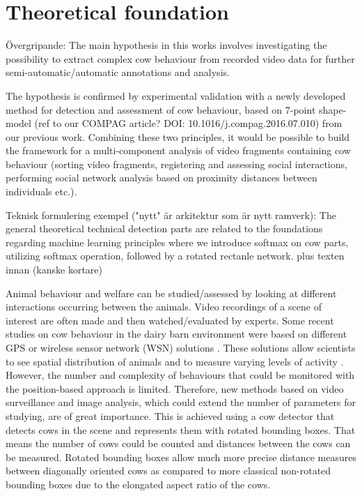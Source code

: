 \documentclass[10pt,a4paper]{article}
\begin{document}
\section{Theoretical foundation}

Övergripande:
The main hypothesis in this works involves investigating the possibility to extract complex cow behaviour from recorded video data for further semi-automatic/automatic annotations and analysis. 

The hypothesis is confirmed by experimental validation with a newly developed method for detection and assessment of cow behaviour, based on 7-point shape-model (ref to our COMPAG article? DOI: 10.1016/j.compag.2016.07.010) from our previous work. Combining these two principles, it would be possible to build the framework for a multi-component analysis of video fragments containing cow behaviour (sorting video fragments, registering and assessing social interactions, performing social network analysis based on proximity distances between individuals etc.).

Teknisk formulering exempel ("nytt" är arkitektur som är nytt ramverk):
The general theoretical technical detection parts are related to the foundations regarding machine learning principles where we introduce softmax on cow parts, utilizing softmax operation, followed by a rotated rectanle network.
plus texten innan (kanske kortare)


Animal behaviour and welfare can be studied/assessed by looking at different interactions occurring between the animals. Video recordings of a scene of interest are often made and then watched/evaluated by experts. Some recent studies on cow behaviour in the dairy barn environment were based on different GPS or wireless sensor network (WSN) solutions \cite{Nadimietal2012}. These solutions allow scientists to see spatial distribution of animals and to measure varying levels of activity \cite{Nadimietal2012}. However, the number and complexity of behaviours that could be monitored with the position-based approach is limited.
 Therefore, new methods based on video surveillance and image analysis, which could extend the number of parameters for studying, are of great importance. This is achieved using a cow detector that detects cows in the scene and represents them with rotated bounding boxes. That means the number of cows could be counted and distances between the cows can be measured. Rotated bounding boxes allow much more precise distance measures between diagonally oriented cows as compared to more classical non-rotated bounding boxes due to the elongated aspect ratio of the cows. 
 
\end{document}
